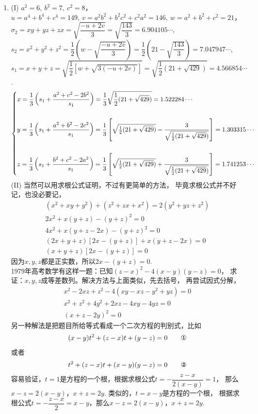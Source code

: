 \begin{enumerate}[label={\textbf{\thechapter.\arabic*}},leftmargin=
    \inteval{\myenumleftmargin}pt]
\item  %
(I) $ a^2=6,\ b^2=7,\ c^2=8 $，\\
$ u=a^4+b^4+c^4=149,\ v=a^2b^2+b^2c^2+c^2a^2=146 ,
\ w=a^2+b^2+c^2=21 $，\\
$ \sigma_2=xy+yz+zx=\sqrt{\dfrac{-u+2v}{3}}=
\sqrt{\dfrac{143}{3}}=6.904105\cdots $, \\
$s_2=x^2+y^2+z^2=\dfrac{1}{2}\left(w-\sqrt{\dfrac{-u+2v}{3}}\right)
=\dfrac{1}{2}\left(21-\sqrt{\dfrac{143}{3}}\right)
=7.047947\cdots$,\\
$ s_1=x+y+z=\sqrt{\dfrac{1}{2}[w+\sqrt{3(-u+2v)}]}=
\sqrt{\dfrac{1}{2}(21+\sqrt{429})}=4.566854\cdots $. 
\begin{gather*}
\begin{dcases}
    x=\dfrac{1}{3}\left(s_1+\dfrac{a^2+c^2-2b^2}{s_1}\right)=
    \dfrac{1}{3}\sqrt{\dfrac{1}{2}(21+\sqrt{429})}
    =1.522284\cdots\\[5mm]
    y=\dfrac{1}{3}\left(s_1+\dfrac{a^2+b^2-2c^2}{s_1}\right)=
    \dfrac{1}{3}\left[\sqrt{\tfrac{1}{2}(21+\sqrt{429})}-
    \dfrac{3}{\sqrt{\frac{1}{2}(21+\sqrt{429})}}\right]
    =1.303315\cdots\\[5mm]
    z=\dfrac{1}{3}\left(s_1+\dfrac{b^2+c^2-2a^2}{s_1}\right)
    =\dfrac{1}{3}\left[\sqrt{\tfrac{1}{2}(21+\sqrt{429})}+
    \dfrac{3}{\sqrt{\frac{1}{2}(21+\sqrt{429})}}\right]
    =1.741253\cdots
\end{dcases} 
\end{gather*}
(II) 当然可以用求根公式证明，不过有更简单的方法，
毕竟求根公式并不好记，也没必要记，
\begin{gather*}
    (x^2+xy+y^2)+(z^2+zx+x^2)=2(y^2+yz+z^2) \\
    2x^2+x(y+z)-(y+z)^2=0 \\
    4x^2+x(y+z-2x)-(y+z)^2=0 \\
    (2x+y+z)[2x-(y+z)]+x(y+z-2x)=0 \\
    (x+y+z)[2x-(y+z)]=0   
\end{gather*}
因为$x,y,z$都是正实数，所以$2x-(y+z)=0$. \\
1979年高考数学有这样一题：已知$(z-x)^2-4(x-y)(y-z)=0$，
求证：$x,y,z$成等差数列。解决方法与上面类似，先去括号，
再尝试因式分解，
\begin{gather*}
    x^2-2xz+z^2-4(xy-xz-y^2+yz)=0  \\
    x^2+z^2+4y^2+2xz-4xy-4yz=0 \\
    (x+z-2y)^2=0
\end{gather*}
另一种解法是把题目所给等式看成一个二次方程的判别式，比如
\begin{gather*}
    (x-y)t^2+(z-x)t+(y-z)=0 \tag*{\ding{172}}
\end{gather*}
或者
\begin{gather*}
    t^2+(z-x)t+(x-y)(y-z)=0 \tag*{\ding{173}}
\end{gather*}
容易验证，$t=1$是方程的一个根，根据求根公式$t=-\dfrac{z-x}{2(x-y)}=1$，
那么$x-z=2(x-y)$，$x+z=2y$. 类似的，$t=x-y$是方程的一个根，
根据求根公式$t=-\dfrac{z-x}{2}=x-y$，那么$x-z=2(x-y)$，$x+z=2y$. 


\end{enumerate}
